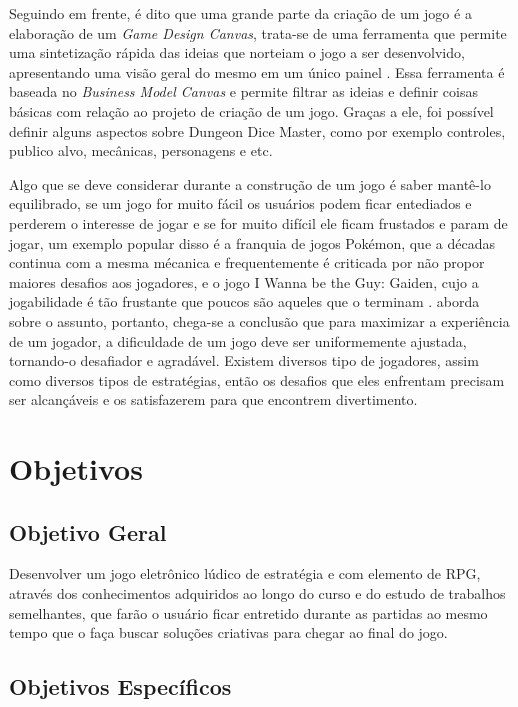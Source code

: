 \documentclass[12pt]{article}
\begin{document}
Seguindo em frente, é dito que uma grande parte da criação de um jogo é a elaboração de um \emph{Game Design Canvas}, trata-se de uma ferramenta que permite uma sintetização rápida das ideias que norteiam o jogo a ser desenvolvido, apresentando uma visão geral do mesmo em um único painel \cite{sarinho2017proposta}. Essa ferramenta é baseada no \emph{Business Model Canvas} e permite filtrar as ideias e definir coisas básicas com relação ao projeto de criação de um jogo. Graças a ele, foi possível definir alguns aspectos sobre Dungeon Dice Master, como por exemplo controles, publico alvo, mecânicas, personagens e etc.

Algo que se deve considerar durante a construção de um jogo é saber mantê-lo equilibrado, se um jogo for muito fácil os usuários podem ficar entediados e perderem o interesse de jogar e se for muito difícil ele ficam frustados e param de jogar, um exemplo popular disso é a franquia de jogos Pokémon, que a décadas continua com a mesma mécanica e frequentemente é criticada por não propor maiores desafios aos jogadores, e o jogo I Wanna be the Guy: Gaiden, cujo a jogabilidade é tão frustante que poucos são aqueles que o terminam . \cite{bostan2009game} aborda sobre o assunto, portanto, chega-se a conclusão que para maximizar a experiência de um jogador, a dificuldade de um jogo deve ser uniformemente ajustada, tornando-o desafiador e agradável. Existem diversos tipo de jogadores, assim como diversos tipos de estratégias, então os desafios que eles enfrentam precisam ser alcançáveis e os satisfazerem para que encontrem divertimento.

\section{Objetivos}

\subsection{Objetivo Geral}

Desenvolver um jogo eletrônico lúdico de estratégia e com elemento de RPG, através dos conhecimentos adquiridos ao longo do curso e do estudo de trabalhos semelhantes, que farão o usuário ficar entretido durante as partidas ao mesmo tempo que o faça buscar soluções criativas para chegar ao final do jogo.

\subsection{Objetivos Específicos}
\end{document}
